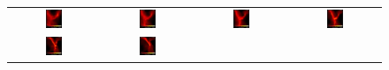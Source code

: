 \begin{figure}[htp]
\centering
\begin{tabular}{cccc}
	\includegraphics[width=0.2\textwidth]{../figures/sph_bates_starcluster_00.jpg} 
 &  \includegraphics[width=0.2\textwidth]{../figures/sph_bates_starcluster_01.jpg}
 &  \includegraphics[width=0.2\textwidth]{../figures/sph_bates_starcluster_02.jpg}
 &  \includegraphics[width=0.2\textwidth]{../figures/sph_bates_starcluster_03.jpg}  
 \\
	\includegraphics[width=0.2\textwidth]{../figures/sph_bates_starcluster_04.jpg} 
 &  \includegraphics[width=0.2\textwidth]{../figures/sph_bates_starcluster_05.jpg} 

\end{tabular}
\end{figure}
